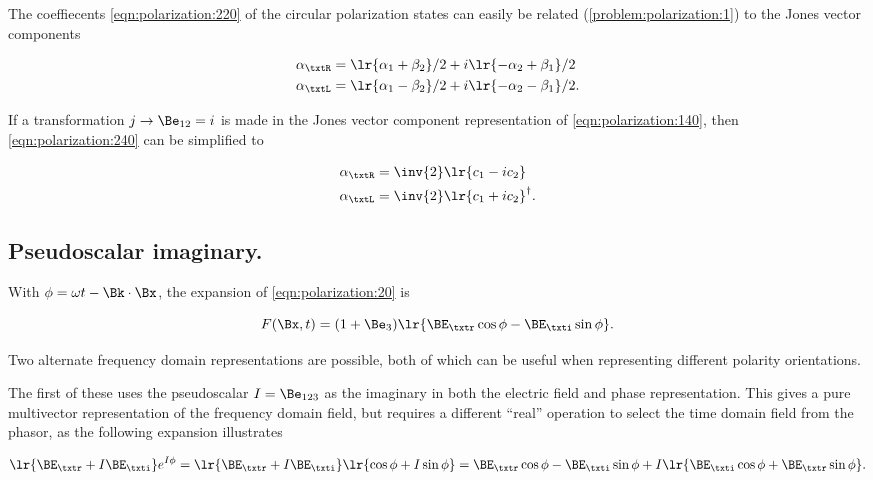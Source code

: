 The coeffiecents \cref{eqn:polarization:220} of the circular polarization states can easily be related (\cref{problem:polarization:1}) to the Jones vector components

\begin{dmath}\label{eqn:polarization:240}
\begin{aligned}
\alpha_\txtR &= \lr{ \alpha_1 + \beta_2 }/2 + i \lr{ -\alpha_2 + \beta_1 }/2 \\
\alpha_\txtL &= \lr{ \alpha_1 - \beta_2 }/2 + i \lr{ -\alpha_2 - \beta_1 }/2.
\end{aligned}
\end{dmath}

If a transformation \( j \rightarrow \Be_{12} = i \) is made in the Jones vector component representation of \cref{eqn:polarization:140}, then \cref{eqn:polarization:240} can be simplified to

\begin{dmath}\label{eqn:polarization:260}
\begin{aligned}
\alpha_\txtR &= \inv{2}\lr{ c_1 - i c_2 } \\
\alpha_\txtL &= \inv{2}\lr{ c_1 + i c_2 }^\dagger.
\end{aligned}
\end{dmath}

\subsection{Pseudoscalar imaginary.}
With \( \phi = \omega t - \Bk \cdot \Bx \), the expansion of \cref{eqn:polarization:20} is

\begin{dmath}\label{eqn:polarization:40}
F(\Bx, t) = (1 + \Be_3) \lr{ \BE_\txtr \cos\phi - \BE_\txti \sin\phi }.
\end{dmath}

Two alternate frequency domain representations are possible, both of which can be useful when representing different polarity orientations.

The first of these uses the  pseudoscalar \( I = \Be_{123} \) as the imaginary in both the electric field and phase representation.  This gives a pure multivector representation of the frequency domain field, but requires a different ``real'' operation to select the time domain field from the phasor, as the following expansion illustrates

\begin{dmath}\label{eqn:polarization:60}
\lr{ \BE_\txtr + I \BE_\txti } e^{I \phi}
=
\lr{ \BE_\txtr + I \BE_\txti } \lr{ \cos\phi + I \sin\phi }
=
\BE_\txtr \cos\phi - \BE_\txti \sin\phi
+
I \lr{ \BE_\txti \cos\phi + \BE_\txtr \sin\phi }.
\end{dmath}

